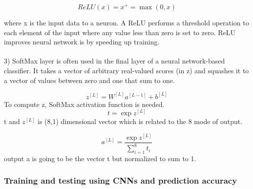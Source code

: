 \begin{equation}
ReLU(x) = x^{+} = \max(0,x) 
\end{equation}

where x is the input data to a neuron. A ReLU performs a threshold operation
to each element of the input where any value less than zero is set to zero. ReLU improves neural network is by speeding up training.
\\
\\
3) SoftMax layer \cite{Ref26} is often used in the final layer of a neural network-based classifier.  It takes a vector of arbitrary real-valued scores (in z) and squashes it to a vector of values between zero and one that sum to one.

\begin{equation}
z^{[L]}=W^{[L]}a^{[L-1]}+b^{[L]} 
\end{equation}
To compute z, SoftMax activation function is needed.
\begin{equation}
t = \exp z^{[L]}
\end{equation}
t and $z^{[L]}$ is (8,1) dimensional vector which is related to the 8 mode of output.

\begin{equation}
a^{[L]} = \frac{\exp z^{[L]}}{\sum_{i=1}^{8} t_i} 
\end{equation}
output a is going to be the vector t but normalized to sum to 1.



\subsubsection{Training and testing using CNNs and prediction accuracy}
\label{subsubsec3}

